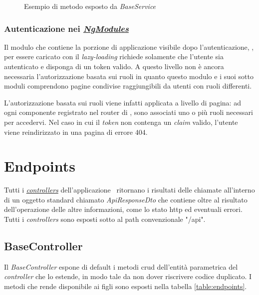 \begin{figure}[H] 
	\centering    
	
	\caption[Esempio di metodo esposto da \textit{BaseService}]{Esempio di metodo esposto da \textit{BaseService}}
	\label{fig:client-auth-base-service}
\end{figure}

\subsubsection{Autenticazione nei \textit{\hyperref[client:modules]{NgModules}}}

Il modulo che contiene la porzione di applicazione visibile dopo l'autenticazione, \textit{}, per essere caricato con il \textit{lazy-loading} richiede solamente che l'utente sia autenticato e disponga di un token valido. A questo livello non è ancora necessaria l'autorizzazione basata sui ruoli in quanto questo modulo e i suoi sotto moduli comprendono pagine condivise raggiungibili da utenti con ruoli differenti.

L'autorizzazione basata sui ruoli viene infatti applicata a livello di pagina: ad ogni componente registrato nel router di \angular, sono associati uno o più ruoli necessari per accedervi. Nel caso in cui il \textit{token} non contenga un \textit{claim} valido, l'utente viene reindirizzato in una pagina di errore 404.

\section{Endpoints}

Tutti i \hyperref[server:controllers]{\textit{controllers}} dell'applicazione \expressjs~ritornano i risultati delle chiamate all'interno di un oggetto standard chiamato \textit{ApiResponseDto} che contiene oltre al risultato dell'operazione delle altre informazioni, come lo stato \acrshort{http} ed eventuali errori. Tutti i \textit{controllers} sono esposti sotto al path convenzionale "/api".

\subsection{BaseController}
\label{server:base-controller}
Il \textit{BaseController} espone di default i metodi \acrshort{crud} dell'entità parametrica del \textit{controller} che lo estende, in modo tale da non dover riscrivere codice duplicato. I metodi che rende disponibile ai figli sono esposti nella tabella \ref{table:endpoints}.


